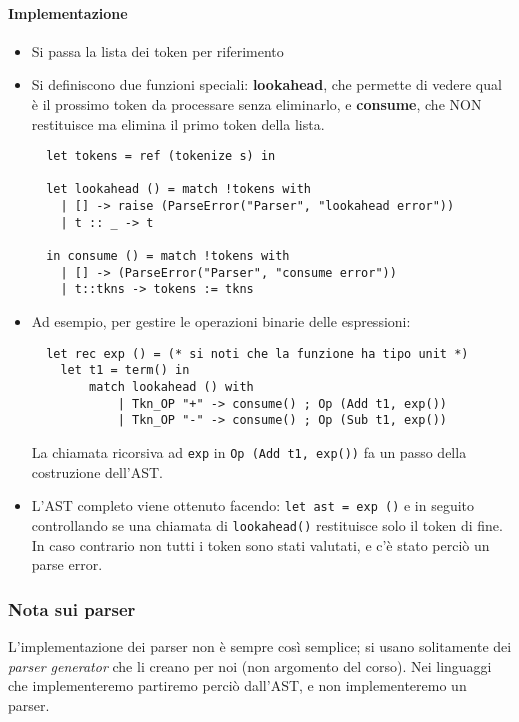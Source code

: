\documentclass[a4paper,10pt]{article}
\begin{document}
\paragraph{Implementazione}
\begin{itemize}
 \item Si passa la lista dei token per riferimento
 \item Si definiscono due funzioni speciali: \textbf{lookahead}, che permette di vedere qual è il prossimo token da processare senza eliminarlo, e \textbf{consume}, che NON restituisce ma elimina il primo token della lista.
 
 \begin{lstlisting}
  let tokens = ref (tokenize s) in 
  
  let lookahead () = match !tokens with
    | [] -> raise (ParseError("Parser", "lookahead error"))
    | t :: _ -> t
    
  in consume () = match !tokens with
    | [] -> (ParseError("Parser", "consume error"))
    | t::tkns -> tokens := tkns \end{lstlisting}

 
 \item Ad esempio, per gestire le operazioni binarie delle espressioni:
 
 \begin{lstlisting}
  let rec exp () = (* si noti che la funzione ha tipo unit *)
    let t1 = term() in  
        match lookahead () with 
            | Tkn_OP "+" -> consume() ; Op (Add t1, exp())
            | Tkn_OP "-" -> consume() ; Op (Sub t1, exp()) \end{lstlisting}
La chiamata ricorsiva ad \texttt{exp} in \texttt{Op (Add t1, exp())} fa un passo della costruzione dell'AST.
\item L'AST completo viene ottenuto facendo: \texttt{let ast = exp ()} e in seguito controllando se una chiamata di \texttt{lookahead()} restituisce solo il token di fine. In caso contrario non tutti i token sono stati valutati, e c'è stato perciò un parse error.
\end{itemize}

\subsubsection{Nota sui parser}
L'implementazione dei parser non è sempre così semplice; si usano solitamente dei \emph{parser generator} che li creano per noi (non argomento del corso). Nei linguaggi che implementeremo partiremo perciò dall'AST, e non implementeremo un parser.
\newpage
\end{document}
